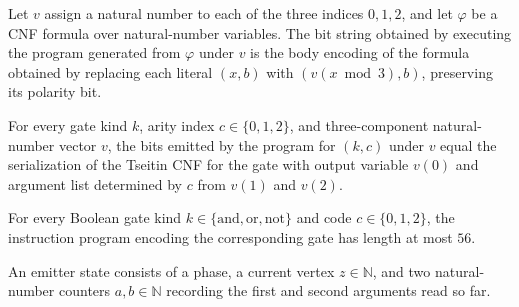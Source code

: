 \begin{theorem}
\label{BoolCircuit.CktSatReduction.Emitter.flatMap_exec_progOf}
\leanok
{}
Let $v$ assign a natural number to each of the three indices $0,1,2$, and let $\varphi$
be a CNF formula over natural-number variables. The bit string obtained by executing the
program generated from $\varphi$ under $v$ is the body encoding of the formula obtained
by replacing each literal $(x,b)$ with $(v(x \bmod 3),b)$, preserving its polarity bit.
\end{theorem}

\begin{theorem}
\label{BoolCircuit.CktSatReduction.Emitter.emitBits_eq}
\leanok
{}
For every gate kind $k$, arity index $c\in\{0,1,2\}$, and three-component natural-number
vector $v$, the bits emitted by the program for $(k,c)$ under $v$ equal the
serialization of the Tseitin CNF for the gate with output variable $v(0)$ and argument
list determined by $c$ from $v(1)$ and $v(2)$.
\end{theorem}

\begin{theorem}
\label{BoolCircuit.CktSatReduction.Emitter.length_prog_le}
\leanok
{}
For every Boolean gate kind $k\in\{\mathrm{and},\mathrm{or},\mathrm{not}\}$ and code
$c\in\{0,1,2\}$, the instruction program encoding the corresponding gate has length at
most $56$.
\end{theorem}

\begin{definition}
\label{BoolCircuit.CktSatReduction.Emitter.ES}
\leanok
{}
An emitter state consists of a phase, a current vertex $z \in \mathbb{N}$, and two
natural-number counters $a,b \in \mathbb{N}$ recording the first and second arguments
read so far.
\end{definition}

